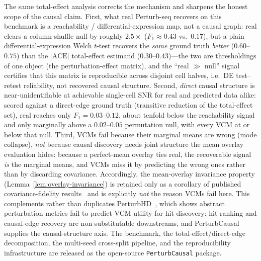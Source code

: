 \documentclass{article}
\theoremstyle{plain}
\theoremstyle{definition}
\theoremstyle{remark}
\begin{document}
The same total-effect analysis corrects the mechanism and sharpens the honest scope of the causal claim. First, what real Perturb-seq recovers on this benchmark is a reachability / differential-expression map, not a causal graph: real clears a column-shuffle null by roughly $2.5\times$ ($F_1 \approx 0.43$ vs.\ $0.17$), but a plain differential-expression Welch $t$-test recovers the \emph{same} ground truth \emph{better} ($0.60$--$0.75$) than the $|\mathrm{ACE}|$ total-effect estimand ($0.30$--$0.43$)---the two are thresholdings of one object (the perturbation-effect matrix), and the ``real $\gg$ null'' signal certifies that this matrix is reproducible across disjoint cell halves, i.e.\ DE test--retest reliability, not recovered causal structure. Second, \emph{direct} causal structure is near-unidentifiable at achievable single-cell SNR for real and predicted data alike: scored against a direct-edge ground truth (transitive reduction of the total-effect set), real reaches only $F_1 = 0.03$--$0.12$, about tenfold below the reachability signal and only marginally above a $0.02$--$0.05$ permutation null, with every VCM at or below that null. Third, VCMs fail because their marginal means are wrong (mode collapse), \emph{not} because causal discovery needs joint structure the mean-overlay evaluation hides: because a perfect-mean overlay ties real, the recoverable signal \emph{is} the marginal means, and VCMs miss it by predicting the wrong ones rather than by discarding covariance. Accordingly, the mean-overlay invariance property (Lemma~\ref{lem:overlay-invariance}) is retained only as a corollary of published covariance-fidelity results~\citep{riasat2026marginals,rubbi2026ggeval} and is explicitly \emph{not} the reason VCMs fail here. This complements rather than duplicates PerturbHD~\citep{bereket2026perturbhd}, which shows abstract perturbation metrics fail to predict VCM utility for hit discovery: hit ranking and causal-edge recovery are non-substitutable downstreams, and PerturbCausal supplies the causal-structure axis. The benchmark, the total-effect/direct-edge decomposition, the multi-seed cross-split pipeline, and the reproducibility infrastructure are released as the open-source \texttt{PerturbCausal} package.
\end{document}
